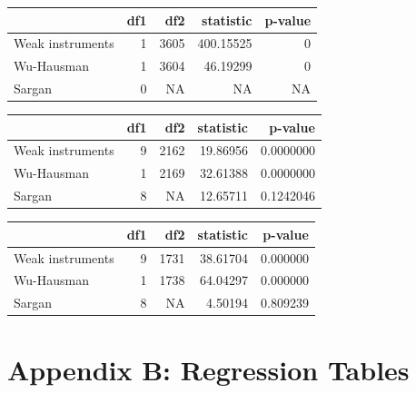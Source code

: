 \documentclass[11pt,preprint, authoryear]{elsarticle}
\let\origtable\table
\let\endorigtable\endtable
\renewenvironment{table}[1][2] {
    \expandafter\origtable\expandafter[H]
} {
    \endorigtable
}
\numberwithin{equation}{section}
\numberwithin{figure}{section}
\numberwithin{table}{section}
\begin{document}
\begin{table}

\caption{\label{tab:Specification}Specification Tests for Mother's Education \label{ME}}
\centering
\begin{tabular}[t]{l|r|r|r|r}
\hline
  & df1 & df2 & statistic & p-value\\
\hline
Weak instruments & 1 & 3605 & 400.15525 & 0\\
\hline
Wu-Hausman & 1 & 3604 & 46.19299 & 0\\
\hline
Sargan & 0 & NA & NA & NA\\
\hline
\end{tabular}
\end{table}

\begin{table}

\caption{\label{tab:Specification}Specification Tests for Father's Occupation \label{FO}}
\centering
\begin{tabular}[t]{l|r|r|r|r}
\hline
  & df1 & df2 & statistic & p-value\\
\hline
Weak instruments & 9 & 2162 & 19.86956 & 0.0000000\\
\hline
Wu-Hausman & 1 & 2169 & 32.61388 & 0.0000000\\
\hline
Sargan & 8 & NA & 12.65711 & 0.1242046\\
\hline
\end{tabular}
\end{table}

\begin{table}

\caption{\label{tab:Specification}Specification Tests for Mother's Occupation \label{MO}}
\centering
\begin{tabular}[t]{l|r|r|r|r}
\hline
  & df1 & df2 & statistic & p-value\\
\hline
Weak instruments & 9 & 1731 & 38.61704 & 0.000000\\
\hline
Wu-Hausman & 1 & 1738 & 64.04297 & 0.000000\\
\hline
Sargan & 8 & NA & 4.50194 & 0.809239\\
\hline
\end{tabular}
\end{table}

\hypertarget{appendix-b-regression-tables}{%
\section*{\texorpdfstring{Appendix B: Regression Tables
\label{appendix}}{Appendix B: Regression Tables }}\label{appendix-b-regression-tables}}
\end{document}
